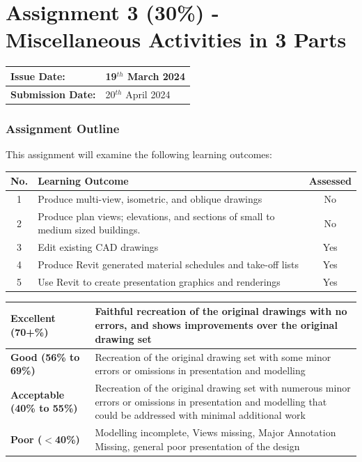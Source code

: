 
	

\part*{Assignment 3 (30\%) - Miscellaneous Activities in 3 Parts}



\begin{tabularx}{\textwidth}{ |X|X| }
	\hline
	\textbf{Issue Date:} & 19$^{th}$ March 2024 \\
	\hline 
	\textbf{Submission Date:}  & 20$^{th}$ April 2024  \\
	\hline
\end{tabularx}



\section*{Assignment Outline}

This assignment will examine the following learning outcomes:

\begin{tabularx}{\textwidth}{ |c|X|c| }
	\hline
	\textbf{No.} & \textbf{Learning Outcome} & \textbf{Assessed} \\
	\hline 
	1  & Produce multi-view, isometric, and oblique drawings & No \\
	2  & Produce plan views; elevations, and sections of small to medium sized buildings. & No \\
	3  & Edit existing CAD drawings & Yes \\
	4  & Produce Revit generated material schedules and take-off lists & Yes \\
	5  & Use Revit to create presentation graphics and renderings & Yes \\
	\hline
\end{tabularx}

\vspace{1cm}

\begin{tabularx}{\textwidth}{ |l|X| }
	\hline 
	\textbf{Excellent (70+\%)} & Faithful recreation of the original drawings with no errors, and shows improvements over the original drawing set\\ 
	\hline
	\textbf{Good (56\% to 69\%)} & Recreation of the original drawing set with some minor errors or omissions in presentation and modelling \\
	\hline
	\textbf{Acceptable (40\% to 55\%)} & Recreation of the original drawing set with numerous minor errors or omissions in presentation and modelling that could be addressed with minimal additional work \\ 
	\hline
	\textbf{Poor ($<$40\%)} & Modelling incomplete, Views missing, Major Annotation Missing, general poor presentation of the design  \\
	\hline
\end{tabularx}

